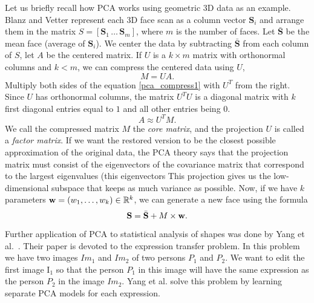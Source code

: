 Let us briefly recall how PCA works using geometric 3D data as an example.
Blanz and Vetter represent each 3D face scan as a column vector $\mathbf{S}_i$
and arrange them in the matrix $S = [ \mathbf{S}_1 \, \dots \, \mathbf{S}_m ]$,
where $m$ is the number of faces. Let $\bar{\mathbf{S}}$ be the mean face (average of $\mathbf{S}_i$). 
We center the data by subtracting $\bar{\mathbf{S}}$ from each column of $S$,
let $A$ be the centered matrix.
If $U$ is a $k \times m$ matrix with orthonormal columns and $k < m$, 
we can compress the centered data using $U$,
\begin{equation}
\label{pca_compress1}
M = U A.
\end{equation}
Multiply both sides of the equation \eqref{pca_compress1} with $U^T$ from the right. 
Since $U$ has orthonormal columns, the matrix $U^T U $ is a diagonal matrix
with $k$ first diagonal entries equal to $1$ and all other entries being $0$. 
\begin{equation}
A \approx U^T M .
\end{equation}
We call the compressed matrix $M$ the \textit{core matrix}, and the projection $U$ is
called a \textit{factor matrix}.  If we want the restored version to be the closest
possible approximation of the original data, the PCA theory says 
that the projection matrix must consist of 
the eigenvectors of the covariance matrix that correspond to the largest eigenvalues (this eigenvectors 
This projection gives us the low-dimensional subspace that keeps as much variance as possible.
Now, if we have $k$ parameters ${\mathbf{w}} = (w_1, \dots, w_k) \in \mathbb{R}^k$, we can generate 
a new face using the formula
\begin{equation}
\label{face_gen_pca}
\mathbf{S} = \bar{\mathbf{S}} + M \times {\mathbf{w}}.
\end{equation}



Further application of PCA to statistical analysis of shapes
was done by Yang et al.~\cite{Yang_2011}. 
Their paper is devoted to the expression transfer problem.
In this problem we have two images ${Im}_1$ and ${Im}_2$ of
two persons $P_1$ and $P_2$. We want to edit the first image $\mathrm{I}_1$
so that the person $P_1$ in this image will have the same expression as the person $P_2$
in the image ${Im}_2$. Yang et al. solve this problem by
learning separate PCA models for each expression. 




